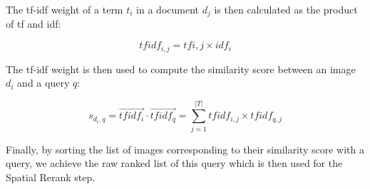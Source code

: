 The tf-idf weight of a term $t_{i}$ in a document $d_{j}$ is then calculated as the product of tf and idf:

\begin{equation}
{tfidf}_{i, j} = tf{i, j} \times idf_{i}
\end{equation}

The tf-idf weight is then used to compute the similarity score between an image $d_{i}$ and a query $q$:

\begin{equation}
s_{d_{i}, q} = \vec{{tfidf}_{i}} \cdot \vec{{tfidf}_{q}} = \sum\limits_{j = 1}^{\left|T\right|} {tfidf}_{i, j} \times {tfidf}_{q, j}
\end{equation} 

Finally, by sorting the list of images corresponding to their similarity score with a query, we achieve the raw ranked list of this query which is then used for the Spatial Rerank step.